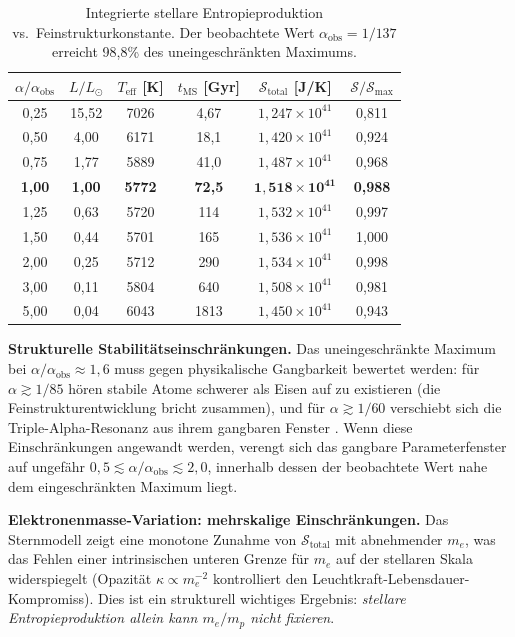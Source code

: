 \documentclass[12pt,a4paper]{article}
\theoremstyle{remark}
\begin{document}
\begin{table}[ht]
\centering
\caption{Integrierte stellare Entropieproduktion vs.\ Feinstrukturkonstante. Der beobachtete Wert $\alpha_{\text{obs}} = 1/137$ erreicht 98,8\% des uneingeschr\"ankten Maximums.}
\label{tab:alpha_scan}
\begin{tabular}{cccccc}
\toprule
$\alpha / \alpha_{\text{obs}}$ & $L / L_\odot$ & $T_{\text{eff}}$ [K] & $t_{\text{MS}}$ [Gyr] & $\mathcal{S}_{\text{total}}$ [J/K] & $\mathcal{S} / \mathcal{S}_{\text{max}}$ \\
\midrule
0{,}25 & 15{,}52 & 7026 & 4{,}67 & $1{,}247 \times 10^{41}$ & 0{,}811 \\
0{,}50 & 4{,}00 & 6171 & 18{,}1 & $1{,}420 \times 10^{41}$ & 0{,}924 \\
0{,}75 & 1{,}77 & 5889 & 41{,}0 & $1{,}487 \times 10^{41}$ & 0{,}968 \\
\textbf{1{,}00} & \textbf{1{,}00} & \textbf{5772} & \textbf{72{,}5} & $\mathbf{1{,}518 \times 10^{41}}$ & \textbf{0{,}988} \\
1{,}25 & 0{,}63 & 5720 & 114 & $1{,}532 \times 10^{41}$ & 0{,}997 \\
1{,}50 & 0{,}44 & 5701 & 165 & $1{,}536 \times 10^{41}$ & 1{,}000 \\
2{,}00 & 0{,}25 & 5712 & 290 & $1{,}534 \times 10^{41}$ & 0{,}998 \\
3{,}00 & 0{,}11 & 5804 & 640 & $1{,}508 \times 10^{41}$ & 0{,}981 \\
5{,}00 & 0{,}04 & 6043 & 1813 & $1{,}450 \times 10^{41}$ & 0{,}943 \\
\bottomrule
\end{tabular}
\end{table}

\textbf{Strukturelle Stabilit\"atseinschr\"ankungen.} Das uneingeschr\"ankte Maximum bei $\alpha / \alpha_{\text{obs}} \approx 1{,}6$ muss gegen physikalische Gangbarkeit bewertet werden: f\"ur $\alpha \gtrsim 1/85$ h\"oren stabile Atome schwerer als Eisen auf zu existieren (die Feinstrukturentwicklung bricht zusammen), und f\"ur $\alpha \gtrsim 1/60$ verschiebt sich die Triple-Alpha-Resonanz aus ihrem gangbaren Fenster \citep{Adams2019}. Wenn diese Einschr\"ankungen angewandt werden, verengt sich das gangbare Parameterfenster auf ungef\"ahr $0{,}5 \lesssim \alpha/\alpha_{\text{obs}} \lesssim 2{,}0$, innerhalb dessen der beobachtete Wert nahe dem eingeschr\"ankten Maximum liegt.

\textbf{Elektronenmasse-Variation: mehrskalige Einschr\"ankungen.} Das Sternmodell zeigt eine monotone Zunahme von $\mathcal{S}_{\text{total}}$ mit abnehmender $m_e$, was das Fehlen einer intrinsischen unteren Grenze f\"ur $m_e$ auf der stellaren Skala widerspiegelt (Opazit\"at $\kappa \propto m_e^{-2}$ kontrolliert den Leuchtkraft-Lebensdauer-Kompromiss). Dies ist ein strukturell wichtiges Ergebnis: \emph{stellare Entropieproduktion allein kann $m_e/m_p$ nicht fixieren}.
\end{document}
